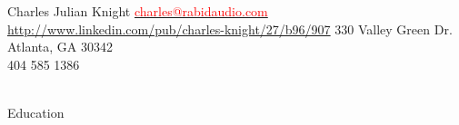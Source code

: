 \documentclass[a4paper,12pt]{article}
\begin{document}
\oddsidemargin=-1cm
\setmainfont

\header
{\LARGE{Charles Julian Knight}}
{{\hspace{.08in}\small \href{mailto:charles@rabidaudio.com}{\textcolor{red}{charles@rabidaudio.com}}}\\
\hspace{0in} \scriptsize \url{http://www.linkedin.com/pub/charles-knight/27/b96/907}}
{330 Valley Green Dr.\\Atlanta, GA 30342\\
{404 585 1386}\\ %
}\\



\begin{resumeblock}{Education}
\largeskip
{}
\largeskip

\end{resumeblock}

\end{document}
